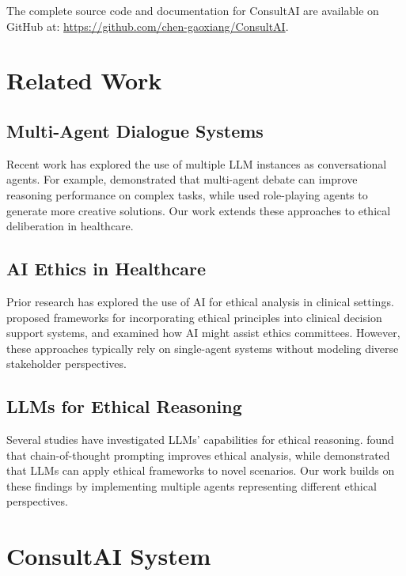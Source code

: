 \documentclass[11pt]{article}
\begin{document}
The complete source code and documentation for ConsultAI are available on GitHub at: \url{https://github.com/chen-gaoxiang/ConsultAI}.

\section{Related Work}

\subsection{Multi-Agent Dialogue Systems}

Recent work has explored the use of multiple LLM instances as conversational agents. For example, \citet{chan2023chateval} demonstrated that multi-agent debate can improve reasoning performance on complex tasks, while \citet{park2023generative} used role-playing agents to generate more creative solutions. Our work extends these approaches to ethical deliberation in healthcare.

\subsection{AI Ethics in Healthcare}

Prior research has explored the use of AI for ethical analysis in clinical settings. \citet{mittelstadt2019principles} proposed frameworks for incorporating ethical principles into clinical decision support systems, and \citet{biller2021ethical} examined how AI might assist ethics committees. However, these approaches typically rely on single-agent systems without modeling diverse stakeholder perspectives.

\subsection{LLMs for Ethical Reasoning}

Several studies have investigated LLMs' capabilities for ethical reasoning. \citet{bang2023multiturn} found that chain-of-thought prompting improves ethical analysis, while \citet{jiang2021can} demonstrated that LLMs can apply ethical frameworks to novel scenarios. Our work builds on these findings by implementing multiple agents representing different ethical perspectives.

\section{ConsultAI System}
\end{document}
